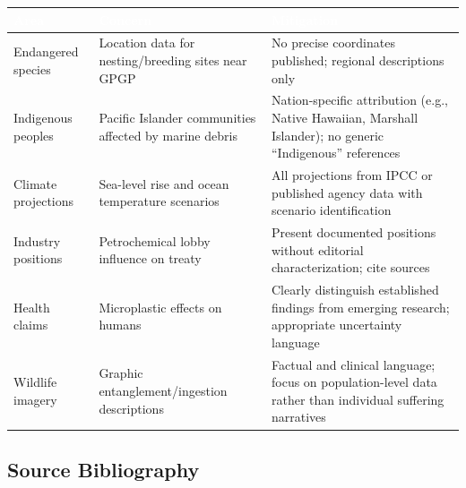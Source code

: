 \documentclass[11pt,letterpaper]{article}
\newcommand{\tableheader}[1]{\textbf{\sffamily\textcolor{white}{#1}}}
\begin{document}
\begin{center}
\begin{tabularx}{\textwidth}{L{3.5cm}L{4cm}X}
\toprule
{}
\tableheader{Area} & \tableheader{Concern} & \tableheader{Mitigation} \\
\midrule
Endangered species & Location data for nesting/breeding sites near GPGP & No precise coordinates published; regional descriptions only \\
Indigenous peoples & Pacific Islander communities affected by marine debris & Nation-specific attribution (e.g., Native Hawaiian, Marshall Islander); no generic ``Indigenous'' references \\
Climate projections & Sea-level rise and ocean temperature scenarios & All projections from IPCC or published agency data with scenario identification \\
Industry positions & Petrochemical lobby influence on treaty & Present documented positions without editorial characterization; cite sources \\
Health claims & Microplastic effects on humans & Clearly distinguish established findings from emerging research; appropriate uncertainty language \\
Wildlife imagery & Graphic entanglement/ingestion descriptions & Factual and clinical language; focus on population-level data rather than individual suffering narratives \\
\bottomrule
\end{tabularx}
\end{center}

\subsection{Source Bibliography}
\end{document}
